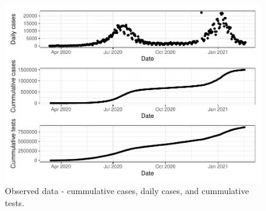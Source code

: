 \documentclass[10pt,letterpaper]{article}
\begin{document}
\begin{figure}
\includegraphics[width=0.99\linewidth]{COVIDincidenceSA_files/figure-latex/unnamed-chunk-4-1} \caption{Observed data - cummulative cases, daily cases, and cummulative tests.}\label{fig:unnamed-chunk-4}
\end{figure}
\end{document}
